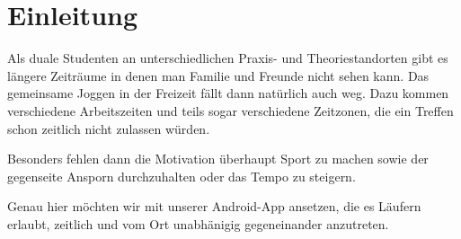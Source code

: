 \section{Einleitung}\label{einleitung}
Als duale Studenten an unterschiedlichen Praxis- und Theoriestandorten gibt es längere Zeiträume in denen man Familie und Freunde nicht sehen kann. Das gemeinsame Joggen in der Freizeit fällt dann natürlich auch weg. Dazu kommen verschiedene Arbeitszeiten und teils sogar verschiedene Zeitzonen, die ein Treffen schon zeitlich nicht zulassen würden. 

Besonders fehlen dann die Motivation überhaupt Sport zu machen sowie der gegenseite Ansporn durchzuhalten oder das Tempo zu steigern. 

Genau hier möchten wir mit unserer Android-App ansetzen, die es Läufern erlaubt, zeitlich und vom Ort unabhänigig gegeneinander anzutreten.